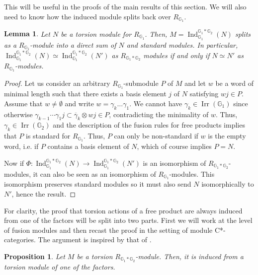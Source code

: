 \documentclass[a4paper, 11pt]{amsart}
\theoremstyle{plain}
\newtheorem{prop}[thm]{Proposition}
\newtheorem{lem}[thm]{Lemma}
\theoremstyle{definition}
\theoremstyle{remark}
\DeclareMathOperator{\Ind}{Ind}
\DeclareMathOperator{\Irr}{Irr}
\newcommand{\G}{\mathbb{G}}
\begin{document}
This will be useful in the proofs of the main results of this section. We will also need to know how the induced module splits back over $R_{\G_{1}}$.

\begin{lem}\label{lem:induceddecomposition}
Let $N$ be a torsion module for $R_{\G_{1}}$. Then, $M = \Ind_{\G_{1}}^{\G_{1}\ast \G_{2}}(N)$ splits as a $R_{\G_{1}}$-module into a direct sum of $N$ and standard modules. In particular, $\Ind_{\G_{1}}^{\G_{1}\ast \G_{2}}(N) \simeq \Ind_{\G_{1}}^{\G_{1}\ast \G_{2}}(N')$ as $R_{\G_{1}\ast\G_{2}}$ modules if and only if $N\simeq N'$ as $R_{\G_{1}}$-modules.
\end{lem}

\begin{proof}
Let us consider an arbitrary $R_{\G_{1}}$-submodule $P$ of $M$ and let $w$ be a word of minimal length such that there exists a basis element $j$ of $N$ satisfying $wj\in P$. Assume that $w\neq \emptyset$ and write $w=\gamma_{k}\dots\gamma_{1}$. We cannot have $\gamma_{k}\in\Irr(\G_{1})$ since otherwise $\gamma_{k-1}\cdots\gamma_{1}j\subset \overline{\gamma}_{k}\otimes wj\in P$, contradicting the minimality of $w$. Thus, $\gamma_{k}\in \Irr(\G_{2})$ and the description of the fusion rules for free products implies that $P$ is standard for $R_{\G_{1}}$. Thus, $P$ can only be non-standard if $w$ is the empty word, i.e. if $P$ contains a basis element of $N$, which of course implies $P=N$.

Now if $\Phi : \Ind_{\G_{1}}^{\G_{1}\ast \G_{2}}(N) \rightarrow \Ind_{\G_{1}}^{\G_{1}\ast \G_{2}}(N')$ is an isomorphism of $R_{\G_{1}\ast\G_{2}}$-modules, it can also be seen as an isomorphism of $R_{\G_{1}}$-modules. This isomorphism preserves standard modules so it must also send $N$ isomorphically to $N'$, hence the result.
\end{proof}

For clarity, the proof that torsion actions of a free product are always induced from one of the factors will be split into two parts. First we will work at the level of fusion modules and then recast the proof in the setting of module C*-categories. The argument is inspired by that of \cite[Thm 1.25]{arano2015torsion}%
.

\begin{prop}\label{prop:torsionfreeproduct}
Let $M$ be a torsion $R_{\G_{1}\ast\G_{2}}$-module. Then, it is induced from a torsion module of one of the factors.
\end{prop}
\end{document}
